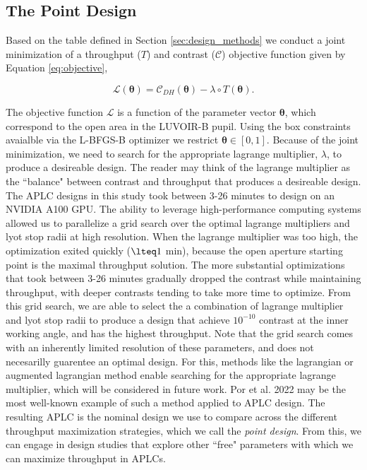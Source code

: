 \documentclass[]{spie}  %
\begin{document}
\subsection{The Point Design}
\label{sec:point_design}

Based on the table defined in Section \ref{sec:design_methods} we conduct a joint minimization of a throughput ($T$) and contrast ($\mathcal{C}$) objective function given by Equation \ref{eq:objective},

\begin{equation}
    \mathcal{L}(\boldsymbol{\theta}) = \mathcal{C}_{DH}(\boldsymbol{\theta}) - \lambda \circ T(\boldsymbol{\theta}).
    \label{eq:objective}
\end{equation}

The objective function $\mathcal{L}$ is a function of the parameter vector $\boldsymbol{\theta}$, which correspond to the open area in the LUVOIR-B pupil. Using the box constraints avaialble via the L-BFGS-B optimizer we restrict $\boldsymbol{\theta} \in [0, 1]$. Because of the joint minimization, we need to search for the appropriate lagrange multiplier, $\lambda$, to produce a desireable design. The reader may think of the lagrange multiplier as the ``balance" between contrast and throughput that produces a desireable design. The APLC designs in this study took between 3-26 minutes to design on an NVIDIA A100 GPU. The ability to leverage high-performance computing systems allowed us to parallelize a grid search over the optimal lagrange multipliers and lyot stop radii at high resolution. When the lagrange multiplier was too high, the optimization exited quickly ($\lteq 1$ min), because the open aperture starting point is the maximal throughput solution. The more substantial optimizations that took between 3-26 minutes gradually dropped the contrast while maintaining throughput, with deeper contrasts tending to take more time to optimize. From this grid search, we are able to select the a combination of lagrange multiplier and lyot stop radii to produce a design that achieve $10^{-10}$ contrast at the inner working angle, and has the highest throughput. Note that the grid search comes with an inherently limited resolution of these parameters, and does not necesarilly guarentee an optimal design. For this, methods like the lagrangian or augmented lagrangian method enable searching for the appropriate lagrange multiplier, which will be considered in future work. Por et al. 2022 may be the most well-known example of such a method applied to APLC design\cite{Por_2022}.
The resulting APLC is the nominal design we use to compare across the different throughput maximization strategies, which we call the \emph{point design}. From this, we can engage in design studies that explore other ``free" parameters with which we can maximize throughput in APLCs.
\end{document}
